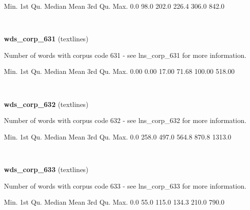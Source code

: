 \documentclass[]{article}
\newenvironment{Shaded}{\begin{snugshade}}{\end{snugshade}}
\newcommand{\FloatTok}[1]{\textcolor[rgb]{0.00,0.00,0.81}{{#1}}}
\newcommand{\NormalTok}[1]{{#1}}
\begin{document}
\begin{Shaded}
\begin{Highlighting}[]
   \NormalTok{Min. 1st Qu.  Median    Mean 3rd Qu.    Max. }
    \FloatTok{0.0}    \FloatTok{98.0}   \FloatTok{202.0}   \FloatTok{226.4}   \FloatTok{306.0}   \FloatTok{842.0} 
\end{Highlighting}
\end{Shaded}

~

\vspace{1em}

\textbf{wds\_corp\_631} (textlines)

Number of words with corpus code 631 - see lns\_corp\_631 for more
information.

\begin{Shaded}
\begin{Highlighting}[]
   \NormalTok{Min. 1st Qu.  Median    Mean 3rd Qu.    Max. }
   \FloatTok{0.00}    \FloatTok{0.00}   \FloatTok{17.00}   \FloatTok{71.68}  \FloatTok{100.00}  \FloatTok{518.00} 
\end{Highlighting}
\end{Shaded}

~

\vspace{1em}

\textbf{wds\_corp\_632} (textlines)

Number of words with corpus code 632 - see lns\_corp\_632 for more
information.

\begin{Shaded}
\begin{Highlighting}[]
   \NormalTok{Min. 1st Qu.  Median    Mean 3rd Qu.    Max. }
    \FloatTok{0.0}   \FloatTok{258.0}   \FloatTok{497.0}   \FloatTok{564.8}   \FloatTok{870.8}  \FloatTok{1313.0} 
\end{Highlighting}
\end{Shaded}

~

\vspace{1em}

\textbf{wds\_corp\_633} (textlines)

Number of words with corpus code 633 - see lns\_corp\_633 for more
information.

\begin{Shaded}
\begin{Highlighting}[]
   \NormalTok{Min. 1st Qu.  Median    Mean 3rd Qu.    Max. }
    \FloatTok{0.0}    \FloatTok{55.0}   \FloatTok{115.0}   \FloatTok{134.3}   \FloatTok{210.0}   \FloatTok{790.0} 
\end{Highlighting}
\end{Shaded}
\end{document}
